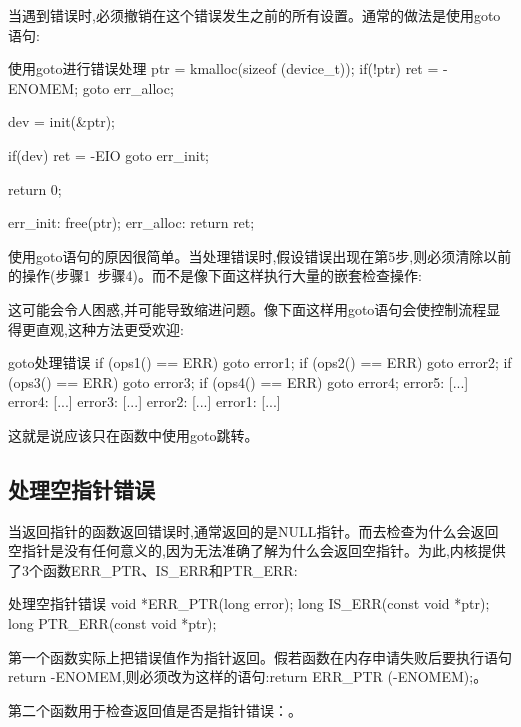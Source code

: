\documentclass[lang=cn,newtx,10pt,scheme=chinese]{elegantbook}
\begin{document}
当遇到错误时,必须撤销在这个错误发生之前的所有设置。通常的做法是使用goto语句:

\begin{mycode}{使用goto进行错误处理}
ptr = kmalloc(sizeof (device_t));
if(!ptr) {
    ret = -ENOMEM;
    goto err_alloc;
}

dev = init(&ptr);

if(dev) {
    ret = -EIO
    goto err_init;
}

return 0;

err_init:
    free(ptr);
err_alloc:
    return ret;
\end{mycode}

使用goto语句的原因很简单。当处理错误时,假设错误出现在第5步,则必须清除以前的操作(步骤1~步骤4)。而不是像下面这样执行大量的嵌套检查操作:

\begin{mycode}{嵌套处理}
if (ops1() != ERR) {
    if (ops2() != ERR) {
        if ( ops3() != ERR) {
            if (ops4() != ERR) {
\end{mycode}

这可能会令人困惑,并可能导致缩进问题。像下面这样用goto语句会使控制流程显得更直观,这种方法更受欢迎:

\begin{mycode}{goto处理错误}
if (ops1() == ERR)
    goto error1;
if (ops2() == ERR)
    goto error2;
if (ops3() == ERR)
    goto error3;
if (ops4() == ERR)
    goto error4;
error5:
[...]
error4:
[...]
error3:
[...]
error2:
[...]
error1:
[...]
\end{mycode}

这就是说应该只在函数中使用goto跳转。

\subsection{处理空指针错误}

当返回指针的函数返回错误时,通常返回的是NULL指针。而去检查为什么会返回空指针是没有任何意义的,因为无法准确了解为什么会返回空指针。为此,内核提供了3个函数ERR\_PTR、IS\_ERR和PTR\_ERR:

\begin{mycode}{处理空指针错误}
void *ERR_PTR(long error);
long IS_ERR(const void *ptr);
long PTR_ERR(const void *ptr);
\end{mycode}

第一个函数实际上把错误值作为指针返回。假若函数在内存申请失败后要执行语句return -ENOMEM,则必须改为这样的语句:return ERR\_PTR (-ENOMEM);。

第二个函数用于检查返回值是否是指针错误：。
\end{document}
